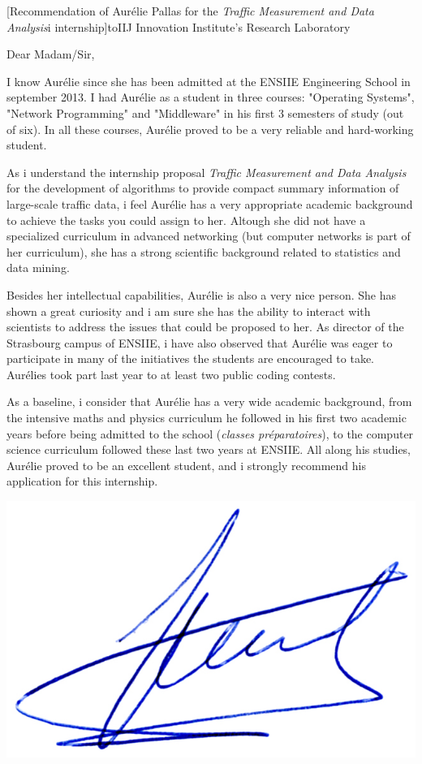 \documentclass[a4paper,10pt]{article}
\begin{document}

\begin{letter}[Recommendation of Aurélie Pallas for the \emph{Traffic Measurement and Data Analysis}i internship]{to}{IIJ Innovation Institute's Research Laboratory} 

Dear Madam/Sir, 

I know Aurélie since she has been admitted at the ENSIIE Engineering School in september 2013.
%
I had Aurélie  as a student in three courses: "Operating Systems",
 "Network Programming" and "Middleware" in his first 3 semesters 
of study (out of six). In all these courses, Aurélie proved to be a
very reliable and hard-working student. 

As i understand the internship proposal \emph{Traffic Measurement and Data Analysis} for
the  development of algorithms to provide compact summary information of large-scale traffic data,
i feel Aurélie has a very appropriate academic background to achieve 
the tasks you could assign to her. Altough she did not have a specialized curriculum
in advanced networking (but computer networks is part of her curriculum), she has  
a strong scientific background related to statistics and data mining.

Besides her intellectual capabilities, Aurélie is also a very nice person. 
She has shown a great curiosity and i am sure she has the ability to interact 
with scientists to address the issues that could be proposed to her.
As director  of the Strasbourg campus of ENSIIE, i have also observed that Aurélie
was eager to participate in many of the initiatives the students are encouraged
to take. Aurélies took part last year to at least two public coding contests.

As a baseline, i consider that Aurélie  has a very wide academic background,
from the intensive maths and physics curriculum he followed in his first two
academic years before being admitted to the school (\emph{classes
  préparatoires}), to the computer science curriculum followed these last
two years at ENSIIE. All along his studies, Aurélie proved to be an excellent 
student, and i strongly recommend his application for this internship.



\end{letter}
\begin{flushright}
\includegraphics[width=.26\textwidth]{signgenaud.jpg}
\end{flushright}
\end{document}
